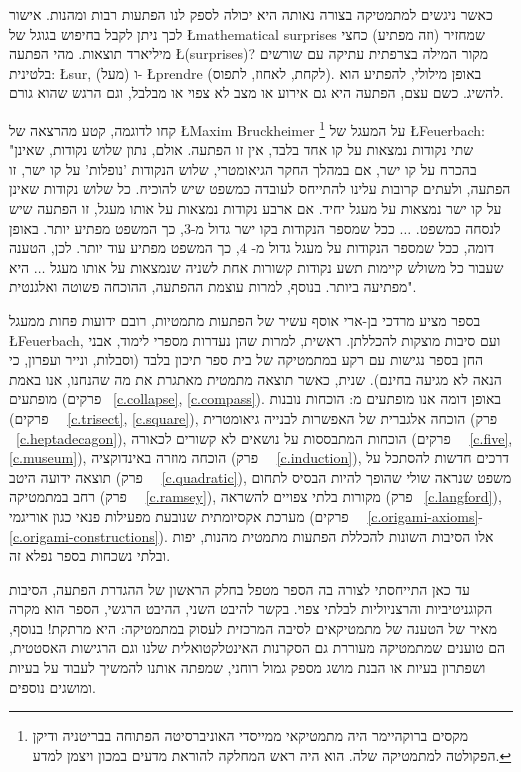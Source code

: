 כאשר ניגשים למתמטיקה בצורה נאותה היא יכולה לספק לנו הפתעות רבות ומהנות. אישור לכך ניתן לקבל בחיפוש בגוגל של 
\L{mathematical surprises}
שמחזיר (וזה מפתיע) כחצי מיליארד תוצאות. מהי הפתעה
\L{(surprises)}?
מקור המילה בצרפתית עתיקה עם שורשים בלטינית: 
\L{sur},
(מעל) ו-%
\L{prendre}
(לקחת, לאחוז, לתפוס). באופן מילולי, להפתיע הוא להשיג. כשם עצם, הפתעה היא גם אירוע או מצב לא צפוי או מבלבל, וגם הרגש שהוא גורם.


קחו לדוגמה, קטע מהרצאה של
\L{Maxim Bruckheimer}%
\footnote{מקסים ברוקהיימר היה מתמטיקאי ממייסדי האוניברסיטה הפתוחה בבריטניה ודיקן הפקולטה למתמטיקה שלה. 
הוא היה ראש המחלקה להוראת מדעים במכון ויצמן למדע.}
על המעגל של
\L{Feuerbach}:
"שתי נקודות נמצאות על קו אחד בלבד, אין זו הפתעה. אולם, נתון שלוש נקודות, שאינן בהכרח על קו ישר, אם במהלך החקר הגיאומטרי, שלוש הנקודות 'נופלות' על קו ישר, זו הפתעה, ולעתים קרובות עלינו להתייחס לעובדה כמשפט שיש להוכיח. כל שלוש נקודות שאינן על קו ישר נמצאות על מעגל יחיד. אם ארבע נקודות נמצאות על אותו מעגל, זו הפתעה שיש לנסחה כמשפט.
$\ldots$
ככל שמספר הנקודות בקו ישר גדול מ-$3$, כך המשפט מפתיע יותר. באופן דומה, ככל שמספר הנקודות על מעגל גדול מ-%
$4$,
כך המשפט מפתיע עוד יותר. לכן, הטענה שעבור כל משולש קיימות תשע נקודות קשורות אחת לשניה שנמצאות על אותו מעגל  
$\ldots$
היא מפתיעה ביותר. בנוסף, למרות עוצמת ההפתעה, ההוכחה פשוטה ואלגנטית".

בספר מציע מרדכי בן-ארי אוסף עשיר של הפתעות מתמטיות, רובם ידועות פחות ממעגל 
\L{Feuerbach},
ועם סיבות מוצקות להכללתן. ראשית, למרות שהן נעדרות מספרי לימוד, אבני החן בספר נגישות עם רקע במתמטיקה של בית ספר תיכון בלבד (וסבלות, ונייר ועפרון, כי הנאה לא מגיעה בחינם). שנית, כאשר תוצאה מתמטית מאתגרת את מה שהנחנו, אנו באמת מופתעים (פרקים~%
\ref{c.collapse}, \ref{c.compass}).
באופן דומה אנו מופתעים מ: הוכחות נובנות (פרקים~%
~\ref{c.trisect}, \ref{c.square}),
הוכחה אלגברית של האפשרות לבנייה גיאומטרית (פרק~%
~\ref{c.heptadecagon}),
הוכחות המתבססות על נושאים לא קשורים לכאורה (פרקים~%
~\ref{c.five}, \ref{c.museum}),
הוכחה מוזרה באינדוקציה (פרק~%
~\ref{c.induction}),
דרכים חדשות להסתכל על תוצאה ידועה היטב (פרק~%
~\ref{c.quadratic}),
משפט שנראה שולי שהופך להיות הבסיס לתחום רחב במתמטיקה (פרק~%
~\ref{c.ramsey}),
מקורות בלתי צפויים להשראה (פרק~%
\ref{c.langford}),
מערכת אקסיומתית שנובעת מפעילות פנאי כגון אוריגמי (פרקים~%
~\ref{c.origami-axioms}-\ref{c.origami-constructions}).
אלו הסיבות השונות להכללת הפתעות מתמטית מהנות, יפות ובלתי נשכחות בספר נפלא זה.

עד כאן התייחסתי לצורה בה הספר מטפל בחלק הראשון של ההגדרת הפתעה, הסיבות הקוגניטיביות והרצניוליות לבלתי צפוי. בקשר להיבט השני, ההיבט הרגשי, הספר הוא מקרה מאיר של הטענה של מתמטיקאים לסיבה המרכזית לעסוק במתמטיקה: היא מרתקת! בנוסף, הם טוענים שמתמטיקה מעוררת גם הסקרנות האינטלקטואלית שלנו וגם הרגישות האסטטית, ושפתרון בעיות או הבנת מושג מספק גמול רוחני, שמפתה אותנו להמשיך לעבוד על בעיות ומושגים נוספים.

